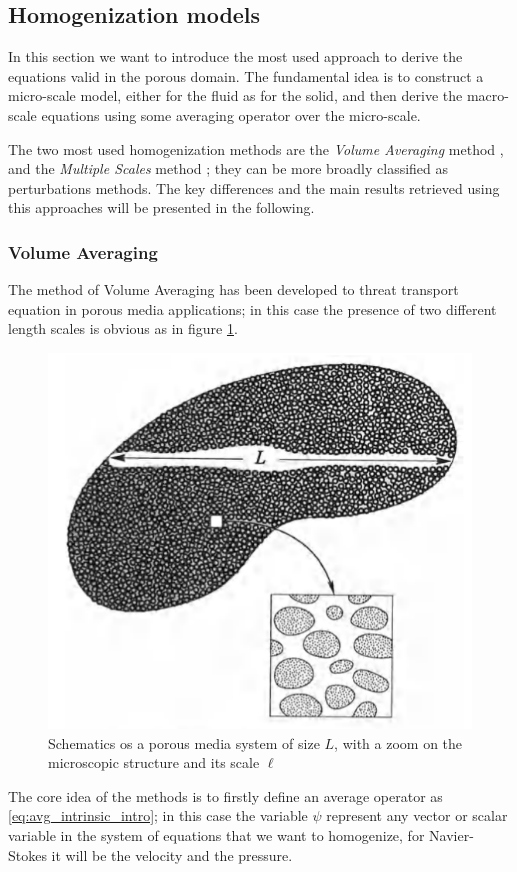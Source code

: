 \subsection{Homogenization models}

In this section we want to introduce the most used approach to derive the equations valid in the porous domain.
The fundamental idea is to construct a micro-scale model, either for the fluid as for the solid, and then derive the macro-scale equations using some averaging operator over the micro-scale.

The two most used homogenization methods are the \textit{Volume Averaging} method \citet{whitaker2013method}, and the \textit{Multiple Scales} method \citet{mei2010homogenization}; they can be more broadly classified as perturbations methods. 
The key differences and the main results retrieved using this approaches will be presented in the following.


\subsubsection{Volume Averaging}
\label{sec:vans}

The method of Volume Averaging has been developed to threat transport equation in porous media applications; in this case the presence of two different length scales is obvious as in figure \ref{fig:porsystem}.
	
	\begin{figure}[h]
		\centering
		\includegraphics[width=0.5\linewidth]{chapter_1/por_system}
		\caption{Schematics os a porous media system of size $L$, with a zoom on the microscopic structure and its scale $\ell$}
		\label{fig:porsystem}
	\end{figure}

The core idea of the methods is to firstly define an average operator as \eqref{eq:avg_intrinsic_intro}; in this case the variable $\psi$ represent any vector or scalar variable in the system of equations that we want to homogenize, for Navier-Stokes it will be the velocity and the pressure.

